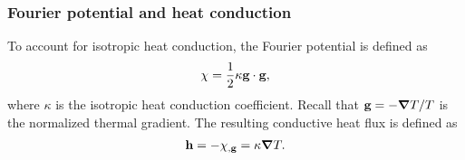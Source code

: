 \subsubsection{Fourier potential and heat conduction}

To account for isotropic heat conduction, the Fourier potential is defined as
\begin{align}
  \chi = \dfrac{1}{2}\kappa\textbf{g}\cdot\textbf{g}, \label{eq: chapter 5 fourier potential}
\end{align}
where $\kappa$ is the isotropic heat conduction coefficient. Recall that $\textbf{g} = - \boldsymbol{\nabla} T / T$ is the normalized thermal gradient. The resulting conductive heat flux is defined as
\begin{align}
  \textbf{h} = -\chi_{,\textbf{g}} = \kappa \boldsymbol{\nabla} T. \label{eq: conductive heat flux}
\end{align}

